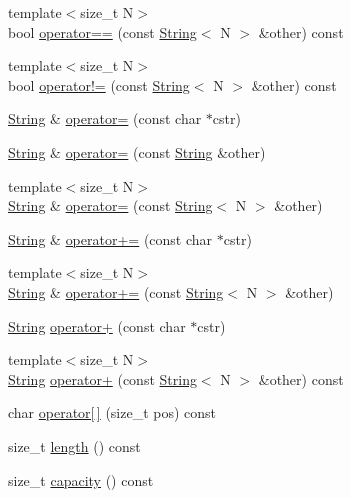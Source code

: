 \begin{DoxyCompactItemize}
\item 
{\footnotesize template$<$size\+\_\+t N$>$ }\\bool \mbox{\hyperlink{class_concept_1_1_string_a2359210adcec96fe1923c13616594686}{operator==}} (const \mbox{\hyperlink{class_concept_1_1_string}{String}}$<$ N $>$ \&other) const
\item 
{\footnotesize template$<$size\+\_\+t N$>$ }\\bool \mbox{\hyperlink{class_concept_1_1_string_a5abc9c7cb95e50758c54aea8fb51c09a}{operator!=}} (const \mbox{\hyperlink{class_concept_1_1_string}{String}}$<$ N $>$ \&other) const
\item 
\mbox{\hyperlink{class_concept_1_1_string}{String}} \& \mbox{\hyperlink{class_concept_1_1_string_a6d3cce47a7d0046d4d54d34c20f6a915}{operator=}} (const char $\ast$cstr)
\item 
\mbox{\hyperlink{class_concept_1_1_string}{String}} \& \mbox{\hyperlink{class_concept_1_1_string_a24a0fb7e31e8be92592ad212b9255166}{operator=}} (const \mbox{\hyperlink{class_concept_1_1_string}{String}} \&other)
\item 
{\footnotesize template$<$size\+\_\+t N$>$ }\\\mbox{\hyperlink{class_concept_1_1_string}{String}} \& \mbox{\hyperlink{class_concept_1_1_string_a42293f97a2fc075a85ec90b5e9850d31}{operator=}} (const \mbox{\hyperlink{class_concept_1_1_string}{String}}$<$ N $>$ \&other)
\item 
\mbox{\hyperlink{class_concept_1_1_string}{String}} \& \mbox{\hyperlink{class_concept_1_1_string_aaf171428c797b78698a4a00ef94e0209}{operator+=}} (const char $\ast$cstr)
\item 
{\footnotesize template$<$size\+\_\+t N$>$ }\\\mbox{\hyperlink{class_concept_1_1_string}{String}} \& \mbox{\hyperlink{class_concept_1_1_string_a8dbe2b6f5c9db7b4534e61c136676f41}{operator+=}} (const \mbox{\hyperlink{class_concept_1_1_string}{String}}$<$ N $>$ \&other)
\item 
\mbox{\hyperlink{class_concept_1_1_string}{String}} \mbox{\hyperlink{class_concept_1_1_string_ae6e294670372f2eeaa224d88f5f1a178}{operator+}} (const char $\ast$cstr)
\item 
{\footnotesize template$<$size\+\_\+t N$>$ }\\\mbox{\hyperlink{class_concept_1_1_string}{String}} \mbox{\hyperlink{class_concept_1_1_string_ab38b1349fc69cb86c1c524a161f5703f}{operator+}} (const \mbox{\hyperlink{class_concept_1_1_string}{String}}$<$ N $>$ \&other) const
\item 
char \mbox{\hyperlink{class_concept_1_1_string_a0ba9ca748e183ec075f4950b6e71ddec}{operator\mbox{[}$\,$\mbox{]}}} (size\+\_\+t pos) const
\item 
size\+\_\+t \mbox{\hyperlink{class_concept_1_1_string_a21547a1e24398236bdf548eddeac437b}{length}} () const
\item 
size\+\_\+t \mbox{\hyperlink{class_concept_1_1_string_a3224cd035b9e0d9f3bdaa4cff8fcbc0f}{capacity}} () const
\end{DoxyCompactItemize}
